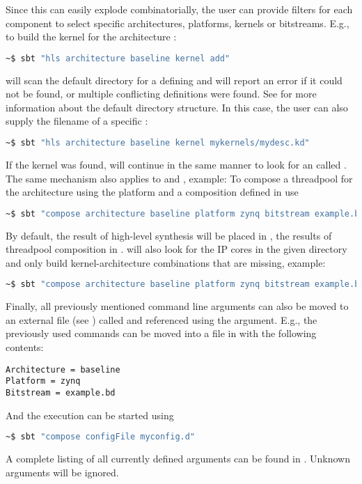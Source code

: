 \medskip
Since this can easily explode combinatorially, the user can provide filters for each component to select specific architectures, platforms, kernels or bitstreams. E.g., to build the kernel  for the architecture :
%
\begin{lstlisting}[language=bash]
~$ sbt "hls architecture baseline kernel add"
\end{lstlisting}
%
\tpc{} will scan the default directory  for a  defining  and will report an error if it could not be found, or multiple conflicting definitions were found.
See  for more information about the default directory structure.
In this case, the user can also supply the filename of a specific :
%
\begin{lstlisting}[language=bash]
~$ sbt "hls architecture baseline kernel mykernels/mydesc.kd"
\end{lstlisting}
%
If the kernel was found, \tpc{} will continue in the same manner to look for an  called .
The same mechanism also applies to  and , example:
To compose a threadpool for the  architecture using the  platform and a composition defined in  use
%
\begin{lstlisting}[language=bash]
~$ sbt "compose architecture baseline platform zynq bitstream example.bd"
\end{lstlisting}
%
By default, the result of high-level synthesis will be placed in , the results of threadpool composition in .
\tpc{} will also look for the IP cores in the given directory and only build kernel-architecture combinations that are missing, example:
%
\begin{lstlisting}[language=bash]
~$ sbt "compose architecture baseline platform zynq bitstream example.bd coreDir myCores"
\end{lstlisting}
%
Finally, all previously mentioned command line arguments can also be moved to an external file (see ) called and referenced using the  argument.
E.g., the previously used commands can be moved into a file  in \tpchome{} with the following contents:
%
\begin{lstlisting}[language=run]
Architecture = baseline
Platform = zynq
Bitstream = example.bd
\end{lstlisting}
%
And the execution can be started using
%
\begin{lstlisting}[language=bash]
~$ sbt "compose configFile myconfig.d"
\end{lstlisting}
%
A complete listing of all currently defined arguments can be found in .
Unknown arguments will be ignored.

